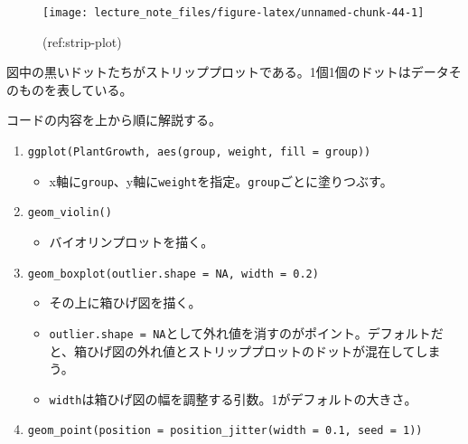 \documentclass[]{book}
\providecommand{\tightlist}{%
  \setlength{\itemsep}{0pt}\setlength{\parskip}{0pt}}
\begin{document}
\begin{figure}

{\centering \texttt{[image: lecture\_note\_files/figure-latex/unnamed-chunk-44-1]} 

}

\caption{(ref:strip-plot)}\label{fig:unnamed-chunk-44}
\end{figure}

図中の黒いドットたちがストリッププロットである。1個1個のドットはデータそのものを表している。

コードの内容を上から順に解説する。

\begin{enumerate}
\def\labelenumi{\arabic{enumi}.}
\setcounter{enumi}{-1}
\item
  \texttt{ggplot(PlantGrowth,\ aes(group,\ weight,\ fill\ =\ group))}

  \begin{itemize}
  \tightlist
  \item
    x軸に\texttt{group}、y軸に\texttt{weight}を指定。\texttt{group}ごとに塗りつぶす。
  \end{itemize}
\item
  \texttt{geom\_violin()}

  \begin{itemize}
  \tightlist
  \item
    バイオリンプロットを描く。
  \end{itemize}
\item
  \texttt{geom\_boxplot(outlier.shape\ =\ NA,\ width\ =\ 0.2)}

  \begin{itemize}
  \item
    その上に箱ひげ図を描く。
  \item
    \texttt{outlier.shape\ =\ NA}として外れ値を消すのがポイント。デフォルトだと、箱ひげ図の外れ値とストリッププロットのドットが混在してしまう。
  \item
    \texttt{width}は箱ひげ図の幅を調整する引数。1がデフォルトの大きさ。
  \end{itemize}
\item
  \texttt{geom\_point(position\ =\ position\_jitter(width\ =\ 0.1,\ seed\ =\ 1))}


\end{enumerate}
\end{document}
